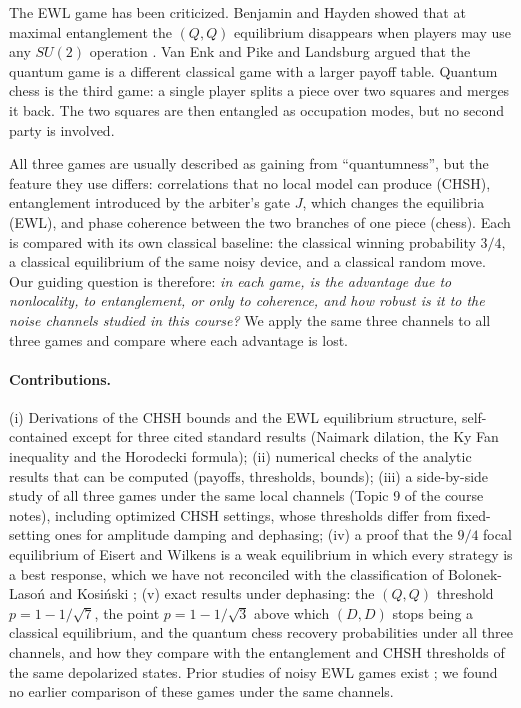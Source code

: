 \documentclass[11pt,a4paper]{article}
\begin{document}
The EWL game has been criticized. Benjamin and Hayden showed that at maximal entanglement the $(Q,Q)$ equilibrium disappears when players may use any $SU(2)$ operation \cite{bh}. Van Enk and Pike \cite{vanenk} and Landsburg \cite{landsburg} argued that the quantum game is a different classical game with a larger payoff table. Quantum chess \cite{cantwell} is the third game: a single player splits a piece over two squares and merges it back. The two squares are then entangled as occupation modes, but no second party is involved.

All three games are usually described as gaining from ``quantumness'', but the feature they use differs: correlations that no local model can produce (CHSH), entanglement introduced by the arbiter's gate $J$, which changes the equilibria (EWL), and phase coherence between the two branches of one piece (chess). Each is compared with its own classical baseline: the classical winning probability $3/4$, a classical equilibrium of the same noisy device, and a classical random move. Our guiding question is therefore: \emph{in each game, is the advantage due to nonlocality, to entanglement, or only to coherence, and how robust is it to the noise channels studied in this course?} We apply the same three channels to all three games and compare where each advantage is lost.

\paragraph{Contributions.} (i) Derivations of the CHSH bounds and the EWL equilibrium structure, self-contained except for three cited standard results (Naimark dilation, the Ky Fan inequality and the Horodecki formula); (ii) numerical checks of the analytic results that can be computed (payoffs, thresholds, bounds); (iii) a side-by-side study of all three games under the same local channels (Topic 9 of the course notes), including optimized CHSH settings, whose thresholds differ from fixed-setting ones for amplitude damping and dephasing; (iv) a proof that the $9/4$ focal equilibrium of Eisert and Wilkens \cite{ew2000} is a weak equilibrium in which every strategy is a best response, which we have not reconciled with the classification of Bolonek-Laso\'n and Kosi\'nski \cite{bolonek}; (v) exact results under dephasing: the $(Q,Q)$ threshold $p=1-1/\sqrt7$, the point $p=1-1/\sqrt3$ above which $(D,D)$ stops being a classical equilibrium, and the quantum chess recovery probabilities under all three channels, and how they compare with the entanglement and CHSH thresholds of the same depolarized states. Prior studies of noisy EWL games exist \cite{johnson,chen,flitney-decoh}; we found no earlier comparison of these games under the same channels.
\end{document}
